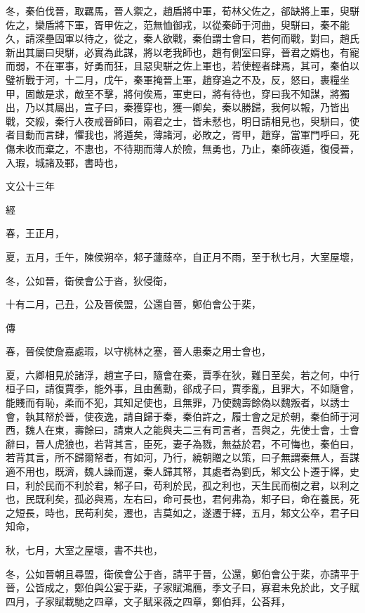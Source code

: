\documentclass{ctexart}
\begin{document}
冬，秦伯伐晉，取羈馬，晉人禦之，趙盾將中軍，荀林父佐之，郤缺將上軍，臾駢佐之，欒盾將下軍，胥甲佐之，范無恤御戎，以從秦師于河曲，臾駢曰，秦不能久，請深壘固軍以待之，從之，秦人欲戰，秦伯謂士會曰，若何而戰，對曰，趙氏新出其屬曰臾駢，必實為此謀，將以老我師也，趙有側室曰穿，晉君之婿也，有寵而弱，不在軍事，好勇而狂，且惡臾駢之佐上軍也，若使輕者肆焉，其可，秦伯以璧祈戰于河，十二月，戊午，秦軍掩晉上軍，趙穿追之不及，反，怒曰，裹糧坐甲，固敵是求，敵至不擊，將何俟焉，軍吏曰，將有待也，穿曰我不知謀，將獨出，乃以其屬出，宣子曰，秦獲穿也，獲一卿矣，秦以勝歸，我何以報，乃皆出戰，交綏，秦行人夜戒晉師曰，兩君之士，皆未憖也，明日請相見也，臾駢曰，使者目動而言肆，懼我也，將遁矣，薄諸河，必敗之，胥甲，趙穿，當軍門呼曰，死傷未收而棄之，不惠也，不待期而薄人於險，無勇也，乃止，秦師夜遁，復侵晉，入瑕，城諸及鄆，書時也，





文公十三年


經



春，王正月，

夏，五月，壬午，陳侯朔卒，邾子蘧蒢卒，自正月不雨，至于秋七月，大室屋壞，

冬，公如晉，衛侯會公于沓，狄侵衛，

十有二月，己丑，公及晉侯盟，公還自晉，鄭伯會公于棐，

傳



春，晉侯使詹嘉處瑕，以守桃林之塞，晉人患秦之用士會也，

夏，六卿相見於諸浮，趙宣子曰，隨會在秦，賈季在狄，難日至矣，若之何，中行桓子曰，請復賈季，能外事，且由舊勳，郤成子曰，賈季亂，且罪大，不如隨會，能賤而有恥，柔而不犯，其知足使也，且無罪，乃使魏壽餘偽以魏叛者，以誘士會，執其帑於晉，使夜逸，請自歸于秦，秦伯許之，履士會之足於朝，秦伯師于河西，魏人在東，壽餘曰，請東人之能與夫二三有司言者，吾與之，先使士會，士會辭曰，晉人虎狼也，若背其言，臣死，妻子為戮，無益於君，不可悔也，秦伯曰，若背其言，所不歸爾帑者，有如河，乃行，繞朝贈之以策，曰子無謂秦無人，吾謀適不用也，既濟，魏人譟而還，秦人歸其帑，其處者為劉氏，邾文公卜遷于繹，史曰，利於民而不利於君，邾子曰，苟利於民，孤之利也，天生民而樹之君，以利之也，民既利矣，孤必與焉，左右曰，命可長也，君何弗為，邾子曰，命在養民，死之短長，時也，民苟利矣，遷也，吉莫如之，遂遷于繹，五月，邾文公卒，君子曰知命，

秋，七月，大室之屋壞，書不共也，

冬，公如晉朝且尋盟，衛侯會公于沓，請平于晉，公還，鄭伯會公于棐，亦請平于晉，公皆成之，鄭伯與公宴于棐，子家賦鴻鴈，季文子曰，寡君未免於此，文子賦四月，子家賦載馳之四章，文子賦采薇之四章，鄭伯拜，公荅拜，
\end{document}

